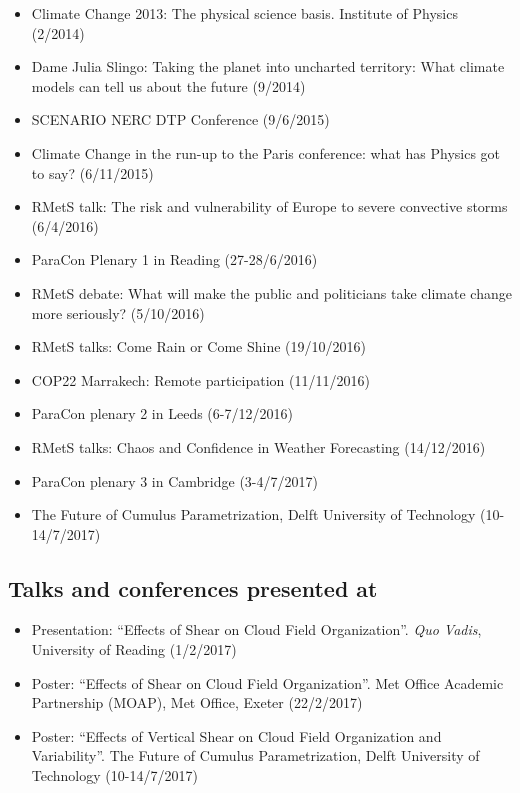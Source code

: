 \documentclass[11pt,a4paper]{article}
\begin{document}
\begin{itemize}
  \item Climate Change 2013: The physical science basis. Institute of Physics (2/2014)
  \item Dame Julia Slingo: Taking the planet into uncharted territory: What climate models can tell us about the future (9/2014)
  \item SCENARIO NERC DTP Conference (9/6/2015)
  \item Climate Change in the run-up to the Paris conference: what has Physics got to say? (6/11/2015)
  \item RMetS talk: The risk and vulnerability of Europe to severe convective storms (6/4/2016)
  \item ParaCon Plenary 1 in Reading (27-28/6/2016)
  \item RMetS debate: What will make the public and politicians take climate change more seriously? (5/10/2016)
  \item RMetS talks: Come Rain or Come Shine (19/10/2016)
  \item COP22 Marrakech: Remote participation (11/11/2016)
  \item ParaCon plenary 2 in Leeds (6-7/12/2016)
  \item RMetS talks: Chaos and Confidence in Weather Forecasting (14/12/2016)
  \item ParaCon plenary 3 in Cambridge (3-4/7/2017)
  \item The Future of Cumulus Parametrization, Delft University of Technology (10-14/7/2017)
\end{itemize}

\subsection*{Talks and conferences presented at}

\begin{itemize}
  \item Presentation: ``Effects of Shear on Cloud Field Organization''. \textit{Quo Vadis}, University of Reading (1/2/2017)
  \item Poster: ``Effects of Shear on Cloud Field Organization''. Met Office Academic Partnership (MOAP), Met Office, Exeter (22/2/2017)
  \item Poster: ``Effects of Vertical Shear on Cloud Field Organization and Variability''. The Future of Cumulus Parametrization, Delft University of Technology (10-14/7/2017)
\end{itemize}
\end{document}
